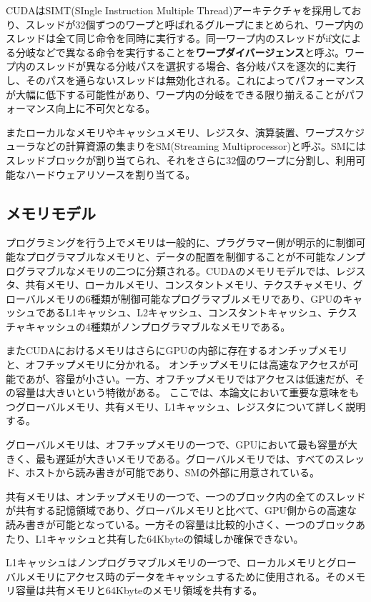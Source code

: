 \documentclass[a4paper,11pt,oneside,openany]{jsbook}
\begin{document}
CUDAはSIMT(SIngle Instruction Multiple Thread)アーキテクチャを採用しており、スレッドが32個ずつのワープと呼ばれるグループにまとめられ、ワープ内のスレッドは全て同じ命令を同時に実行する。同一ワープ内のスレッドがif文による分岐などで異なる命令を実行することを{\bf ワープダイバージェンス}と呼ぶ。ワープ内のスレッドが異なる分岐パスを選択する場合、各分岐パスを逐次的に実行し、そのパスを通らないスレッドは無効化される。これによってパフォーマンスが大幅に低下する可能性があり、ワープ内の分岐をできる限り揃えることがパフォーマンス向上に不可欠となる。

またローカルなメモリやキャッシュメモリ、レジスタ、演算装置、ワープスケジューラなどの計算資源の集まりをSM(Streaming Multiprocessor)と呼ぶ。SMにはスレッドブロックが割り当てられ、それをさらに32個のワープに分割し、利用可能なハードウェアリソースを割り当てる。

\subsection{メモリモデル}
プログラミングを行う上でメモリは一般的に、プラグラマー側が明示的に制御可能なプログラマブルなメモリと、データの配置を制御することが不可能なノンプログラマブルなメモリの二つに分類される。CUDAのメモリモデルでは、レジスタ、共有メモリ、ローカルメモリ、コンスタントメモリ、テクスチャメモリ、グローバルメモリの6種類が制御可能なプログラマブルメモリであり、GPUのキャッシュであるL1キャッシュ、L2キャッシュ、コンスタントキャッシュ、テクスチャキャッシュの4種類がノンプログラマブルなメモリである。

またCUDAにおけるメモリはさらにGPUの内部に存在するオンチップメモリと、オフチップメモリに分かれる。
オンチップメモリには高速なアクセスが可能であが、容量が小さい。一方、オフチップメモリではアクセスは低速だが、その容量は大きいという特徴がある。
ここでは、本論文において重要な意味をもつグローバルメモリ、共有メモリ、L1キャッシュ、レジスタについて詳しく説明する。

グローバルメモリは、オフチップメモリの一つで、GPUにおいて最も容量が大きく、最も遅延が大きいメモリである。グローバルメモリでは、すべてのスレッド、ホストから読み書きが可能であり、SMの外部に用意されている。

共有メモリは、オンチップメモリの一つで、一つのブロック内の全てのスレッドが共有する記憶領域であり、グローバルメモリと比べて、GPU側からの高速な読み書きが可能となっている。一方その容量は比較的小さく、一つのブロックあたり、L1キャッシュと共有した64Kbyteの領域しか確保できない。

L1キャッシュはノンプログラマブルメモリの一つで、ローカルメモリとグローバルメモリにアクセス時のデータをキャッシュするために使用される。そのメモリ容量は共有メモリと64Kbyteのメモリ領域を共有する。
\end{document}
